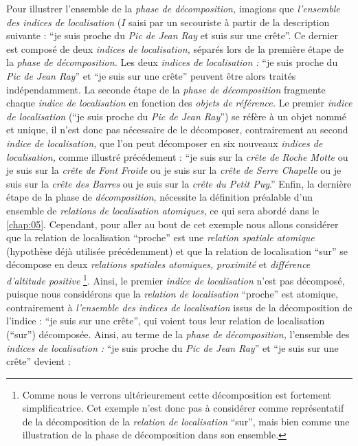 Pour illustrer l'ensemble de la \emph{phase de décomposition,}
imagions que \emph{l'ensemble des indices de localisation} (\(I\)
saisi par un secouriste à partir de la description suivante :
\enquote{je suis proche du \emph{Pic de Jean Ray} et suis sur une
  crête}. Ce dernier est composé de deux \emph{indices de
  localisation,} séparés lors de la première étape de la \emph{phase
  de décomposition.} Les deux \emph{indices de localisation :}
\enquote{je suis proche du \emph{Pic de Jean Ray}} et \enquote{je suis
  sur une crête} peuvent être alors traités indépendamment. La seconde
étape de la \emph{phase de décomposition} fragmente chaque
\emph{indice de localisation} en fonction des \emph{objets de
  référence.} Le premier \emph{indice de localisation} (\enquote{je
  suis proche du \emph{Pic de Jean Ray}}) se réfère à un objet nommé
et unique, il n'est donc pas nécessaire de le décomposer,
contrairement au second \emph{indice de localisation,} que l'on peut
décomposer en six nouveaux \emph{indices de localisation,} comme
illustré précédement : \enquote{je suis sur la \emph{crête de Roche
    Motte} ou je suis sur la \emph{crête de Font Froide} ou je suis
  sur la \emph{crête de Serre Chapelle} ou je suis sur la \emph{crête
    des Barres} ou je suis sur la \emph{crête du Petit Puy}.} Enfin,
la dernière étape de la phase de \emph{décomposition,} nécessite la
définition préalable d'un ensemble de \emph{relations de localisation
  atomiques,} ce qui sera abordé dans le \autoref{chap:05}. Cependant,
pour aller au bout de cet exemple nous allons considérer que la
relation de localisation \enquote{proche} est une \emph{relation
  spatiale atomique} (hypothèse déjà utilisée précédemment) et que la
relation de localisation \enquote{sur} se décompose en deux
\emph{relations spatiales atomiques,} \emph{proximité} et
\emph{différence d'altitude positive} \footnote{Comme nous le verrons
  ultérieurement cette décomposition est fortement
  simplificatrice. Cet exemple n'est donc pas à considérer comme
  représentatif de la décomposition de la \emph{relation de
    localisation} \enquote{sur}, mais bien comme une illustration de
  la phase de décomposition dans son ensemble.}. Ainsi, le premier
\emph{indice de localisation} n'est pas décomposé, puisque nous
considérons que la \emph{relation de localisation} \enquote{proche}
est atomique, contrairement à \emph{l'ensemble des indices de
  localisation} issus de la décomposition de l'indice : \enquote{je
  suis sur une crête}, qui voient tous leur relation de localisation
(\enquote{sur}) décomposée. Ainsi, au terme de la \emph{phase de
  décomposition,} l'ensemble des \emph{indices de localisation :}
\enquote{je suis proche du \emph{Pic de Jean Ray}} et \enquote{je suis
  sur une crête} devient :

